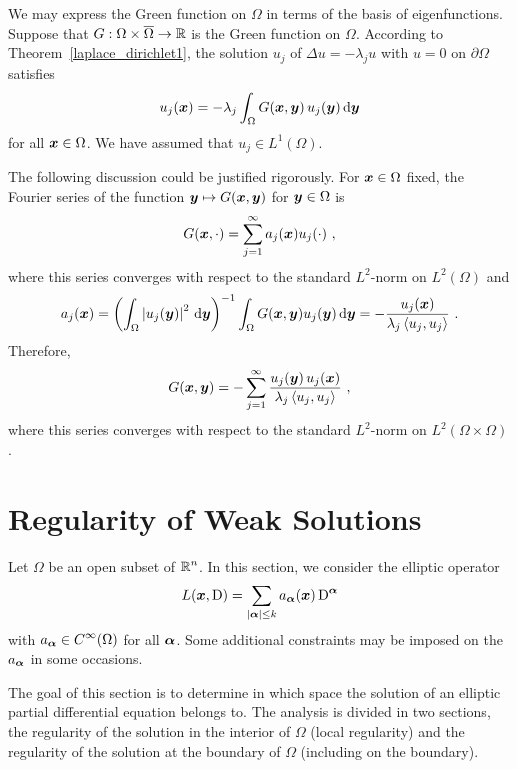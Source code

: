 \begin{egg}
We may express the Green function on $\Omega$ in terms of the basis
of eigenfunctions.  Suppose that
$G:\Omega\times\overline{\Omega} \rightarrow \mathbb{R}$ is the Green
function on $\Omega$.  According to
Theorem~\ref{laplace_dirichlet1}, the solution $u_j$ of
$\Delta u = -\lambda_j u$ with $u=0$ on $\partial \Omega$ satisfies
\[
u_j({\bm{x}}) = -\lambda_j \int_{\Omega} G({\bm{x}},{\bm{y}})\, u_j({\bm{y}})
\,\mathrm{d}{{\bm{y}}}
\]
for all ${\bm{x}} \in \Omega$.  We have assumed that
$\displaystyle u_j \in L^1(\Omega)$.

The following discussion could be justified rigorously.
For ${\bm{x}} \in \Omega$ fixed, the Fourier series of
the function ${\bm{y}} \mapsto G({\bm{x}},{\bm{y}})$ for
${\bm{y}} \in \Omega$ is
\[
G({\bm{x}}, \cdot) = \sum_{j=1}^\infty a_j({\bm{x}}) u_j(\cdot) \ ,
\]
where this series converges with respect to the
standard $\displaystyle L^2$-norm on $\displaystyle L^2(\Omega)$ and
\[
a_j({\bm{x}})
= \left( \int_{\Omega} \left|u_j({\bm{y}})\right|^2 \,\mathrm{d}{{\bm{y}}} \right)^{-1}
\int_{\Omega} G({\bm{x}},{\bm{y}}) u_j({\bm{y}}) \,\mathrm{d}{{\bm{y}}}
= - \frac{u_j({\bm{x}})}{\lambda_j \left\langle{u_j} , {u_j}\right\rangle} \ .
\]
Therefore,
\[
G({\bm{x}},{\bm{y}}) = - \sum_{j=1}^\infty \frac{u_j({\bm{y}})\,u_j({\bm{x}})}
{\lambda_j \left\langle{u_j} , {u_j}\right\rangle} \ ,
\]
where this series converges with respect to the standard
$\displaystyle L^2$-norm on $\displaystyle L^2(\Omega\times\Omega)$.
\end{egg}

\section{Regularity of Weak Solutions} \label{ell_reg_of_sols}

Let $\Omega$ be an open subset of $\displaystyle \mathbb{R}^n$.  In this section, we
consider the elliptic operator 
\begin{equation} \label{ell_reg_ellOp}
L({\bm{x}},\operatorname{D}) = \sum_{|{\bm{\alpha}}|\leq k}
a_{{\bm{\alpha}}}({\bm{x}}) \operatorname{D}^{{\bm{\alpha}}}
\end{equation}
with $\displaystyle a_{{\bm{\alpha}}} \in C^\infty(\Omega)$ for all
${\bm{\alpha}}$.  Some additional constraints may be imposed on the
$a_{{\bm{\alpha}}}$ in some occasions. 

The goal of this section is to determine in which space the solution
of an elliptic partial differential equation belongs to.
The analysis is divided in two sections, the regularity of the
solution in the interior of $\Omega$ (local regularity) and the
regularity of the solution at the boundary of $\Omega$ (including on
the boundary).


